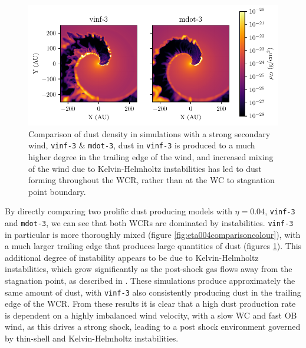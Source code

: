 \begin{figure}
  \centering
  \includegraphics{assets/results/mixed/eta-004-comparison-rhod.pdf}
  \caption[]{Comparison of dust density in simulations with a strong secondary wind, \texttt{vinf-3} \& \texttt{mdot-3}, dust in \texttt{vinf-3} is produced to a much higher degree in the trailing edge of the wind, and increased mixing of the wind due to Kelvin-Helmholtz instabilities has led to dust forming throughout the WCR, rather than at the WC to stagnation point boundary.}
  \label{fig:eta004comparisonrhod}
\end{figure}

By directly comparing two prolific dust producing models with $\eta = 0.04$, \texttt{vinf-3} and \texttt{mdot-3}, we can see that both WCRs are dominated by instabilities.
\texttt{vinf-3} in particular is more thoroughly mixed (figure \ref{fig:eta004comparisoncolour}), with a much larger trailing edge that produces large quantities of dust (figures \ref{fig:eta004comparisonrhod}).
This additional degree of instability appears to be due to Kelvin-Helmholtz instabilities, which grow significantly as the post-shock gas flows away from the stagnation point, as described in \textcite{stevens_colliding_1992}.
These simulations produce approximately the same amount of dust, with \texttt{vinf-3} also consistently producing dust in the trailing edge of the WCR.
From these results it is clear that a high dust production rate is dependent on a highly imbalanced wind velocity, with a slow WC and fast OB wind, as this drives a strong shock, leading to a post shock environment governed by thin-shell and Kelvin-Helmholtz instabilities.



